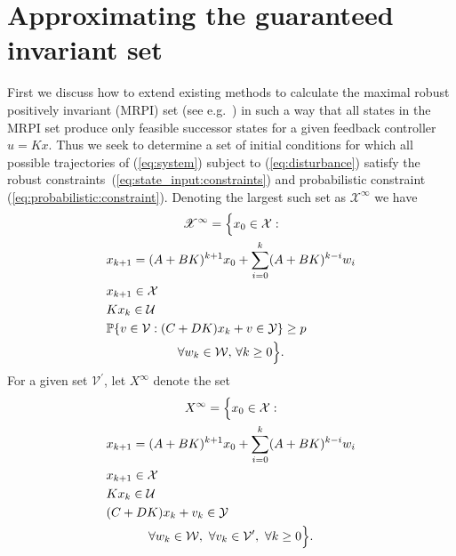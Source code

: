 \documentclass{ifacconf}
\providecommand{\Xinfty}{{\mathscr X}^\infty}
\providecommand{\W}{\mathcal W}
\providecommand{\V}{\mathcal V}
\providecommand{\X}{\mathcal X}
\providecommand{\Y}{\mathcal Y}
\providecommand{\U}{\mathcal U}
\providecommand{\PP}{\mathbb P}
\begin{document}
\section{Approximating the guaranteed invariant set}\label{ssec:approximating:MRPI}
%
First we discuss how to extend existing methods to calculate the maximal robust positively invariant (MRPI) set (see e.g.~\cite{blanchini:2007}) in such a way that all states in the MRPI set produce only feasible successor states for a given feedback controller $u = Kx$.
%
Thus we seek to determine a set of initial conditions for which all possible trajectories of (\ref{eq:system}) subject to (\ref{eq:disturbance}) satisfy the robust constraints~(\ref{eq:state_input:constraints}) and probabilistic constraint (\ref{eq:probabilistic:constraint}). Denoting the largest such set as $\Xinfty$ we have
\begin{multline*}
\Xinfty = \Bigl\{x_0\in\X: \\
\begin{aligned}
&x_{k+1} = (A+BK)^{k+1} x_0 + \sum_{i=0}^{k} (A+BK)^{k-i} w_{i}\\
&x_{k+1}\in\X\\
&Kx_k\in\U\\
&\PP\{v\in\V : (C+DK)x_k+v\in\Y\}\geq p 
\end{aligned}\\
\forall w_k\in\W,\, \forall k\geq 0 \Bigr\} .
\end{multline*}
%
%
For a given set $\V^\prime$, let $X^\infty$ denote the set
%
\begin{multline}\label{eq:alternative:MRPI:set}
	X^\infty = \Bigl\{x_0\in\X: \\
\begin{aligned} 
&x_{k+1} = (A+BK)^{k+1} x_0 + \sum_{i=0}^{k} (A+BK)^{k-i} w_{i} \\
&x_{k+1}\in\X \\ 
&Kx_k\in\U \\
&(C+DK)x_k+v_k\in\Y
\end{aligned}\\
\forall w_k\in\W,\ \forall v_k\in \V^\prime,\ \forall k\geq 0 \Bigr\} .
\end{multline}
\end{document}
